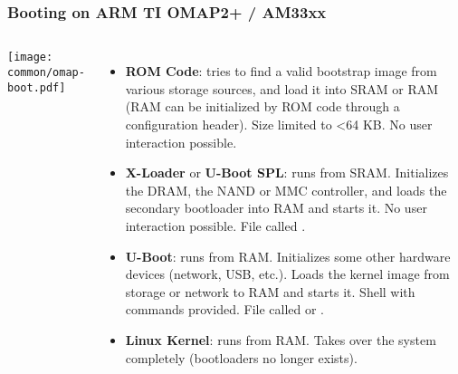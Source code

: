 \begin{frame}
\frametitle{Booting on ARM TI OMAP2+ / AM33xx}
  \begin{columns}
    \texttt{[image: common/omap-boot.pdf]}
    \footnotesize
    \begin{itemize}
    \item {\bf ROM Code}: tries to find a valid bootstrap image from
      various storage sources, and load it into SRAM or RAM (RAM can
      be initialized by ROM code through a configuration header). Size
      limited to \textless 64 KB. No user interaction possible.
    \item {\bf X-Loader} or {\bf U-Boot SPL}: runs from SRAM. Initializes
      the DRAM, the NAND or MMC controller, and loads the secondary
      bootloader into RAM and starts it. No user interaction
      possible. File called .
    \item {\bf U-Boot}: runs from RAM. Initializes some other hardware
      devices (network, USB, etc.).  Loads the kernel image from
      storage or network to RAM and starts it. Shell with commands
      provided. File called  or .
    \item {\bf Linux Kernel}: runs from RAM. Takes over the system
      completely (bootloaders no longer exists).
    \end{itemize}
  \end{columns}
\end{frame}

